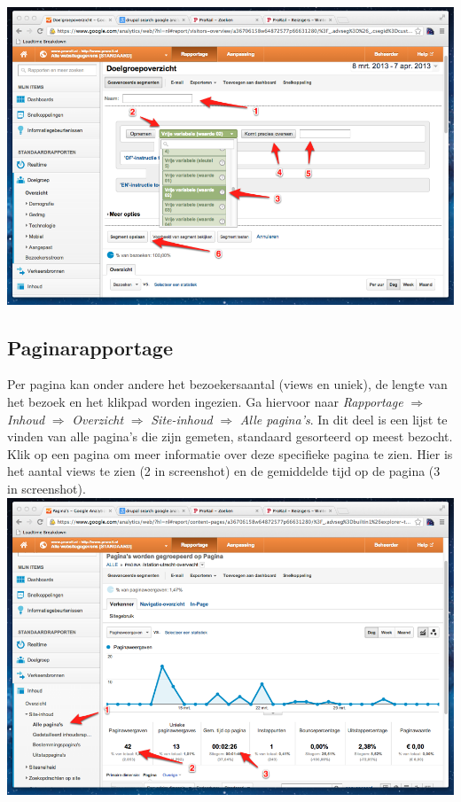 \includegraphics[width=\textwidth]{img/stats8.png}


\subsection{Paginarapportage}
Per pagina kan onder andere het bezoekersaantal (views en uniek), de lengte van het bezoek en het klikpad worden ingezien. Ga hiervoor naar \emph{Rapportage} $\Rightarrow$ \emph{Inhoud} $\Rightarrow$ \emph{Overzicht} $\Rightarrow$ \emph{Site-inhoud} $\Rightarrow$ \emph{Alle pagina's}. In dit deel is een lijst te vinden van alle pagina's die zijn gemeten, standaard gesorteerd op meest bezocht. Klik op een pagina om meer informatie over deze specifieke pagina te zien. Hier is het aantal views te zien (2 in screenshot) en de gemiddelde tijd op de pagina (3 in screenshot).
\\

\includegraphics[width=\textwidth]{img/stats9.png}

